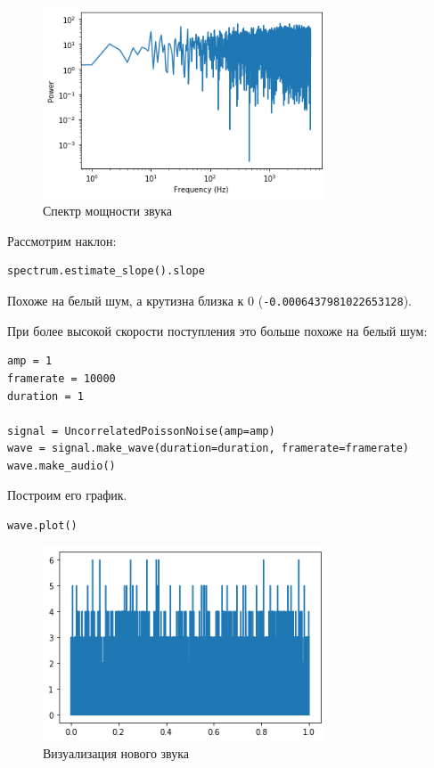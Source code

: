 \documentclass[a4paper,12pt]{report}
\begin{document}
\begin{figure}[H]
        \centering
        \includegraphics[width=0.75\textwidth]{lab4_fig4_2.png}
        \caption{Спектр мощности звука}
        \label{fig:lab4_fig4_2}
\end{figure}

Рассмотрим наклон:

\begin{lstlisting}[caption=Наклон прямой]
spectrum.estimate_slope().slope
\end{lstlisting}

Похоже на белый шум, а крутизна близка к 0 (\texttt{-0.0006437981022653128}).

При более высокой скорости поступления это больше похоже на белый шум:

\begin{lstlisting}[caption=Создание нового звука]
amp = 1
framerate = 10000
duration = 1

signal = UncorrelatedPoissonNoise(amp=amp)
wave = signal.make_wave(duration=duration, framerate=framerate)
wave.make_audio()
\end{lstlisting}

Построим его график.

\begin{lstlisting}[caption=Визуализация нового звука]
wave.plot()
\end{lstlisting}

\begin{figure}[H]
        \centering
        \includegraphics[width=0.75\textwidth]{lab4_fig4_3.png}
        \caption{Визуализация нового звука}
        \label{fig:lab4_fig4_3}
\end{figure}
\end{document}
